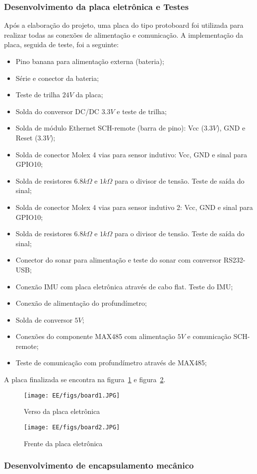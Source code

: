 \subsubsection{Desenvolvimento da placa eletrônica e Testes}
Após a elaboração do projeto, uma placa do tipo protoboard foi utilizada para
realizar todas as conexões de alimentação e comunicação. A implementação da
placa, seguida de teste, foi a seguinte:
\begin{itemize}
  \item Pino banana para alimentação externa (bateria);
  \item Série e conector da bateria;
  \item Teste de trilha $24V$ da placa;
  \item Solda do conversor DC/DC $3.3V$ e teste de trilha;
  \item Solda de módulo Ethernet SCH-remote (barra de pino): Vcc ($3.3V$), GND e
  Reset ($3.3V$);
  \item Solda de conector Molex 4 vias para sensor indutivo: Vcc, GND e sinal
  para GPIO10;
  \item Solda de resistores $6.8k\Omega$ e $1k\Omega$ para o divisor de tensão.
  Teste de saída do sinal;
  \item Solda de conector Molex 4 vias para sensor indutivo 2: Vcc, GND e sinal
  para GPIO10;
  \item Solda de resistores $6.8k\Omega$ e $1k\Omega$ para o divisor de tensão.
  Teste de saída do sinal;
  \item Conector do sonar para alimentação e teste do sonar com conversor
  RS232-USB;
  \item Conexão IMU com placa eletrônica através de cabo flat. Teste do IMU;
  \item Conexão de alimentação do profundímetro;
  \item Solda de conversor $5V$;
  \item Conexões do componente MAX485 com alimentação $5V$ e comunicação
  SCH-remote;
  \item Teste de comunicação com profundímetro através de MAX485;  
\end{itemize}

A placa finalizada se encontra na figura~\ref{fig:board1} e
figura~\ref{fig:board2}.


\begin{figure}[H]
 \centering
 \texttt{[image: EE/figs/board1.JPG]}
 \caption{Verso da placa eletrônica}
 \label{fig:board1}
 \end{figure}
 
 \begin{figure}[H]
 \centering
 \texttt{[image: EE/figs/board2.JPG]}
 \caption{Frente da placa eletrônica}
 \label{fig:board2}
 \end{figure}

\subsubsection{Desenvolvimento de encapsulamento mecânico}
 

\label{metodos}


